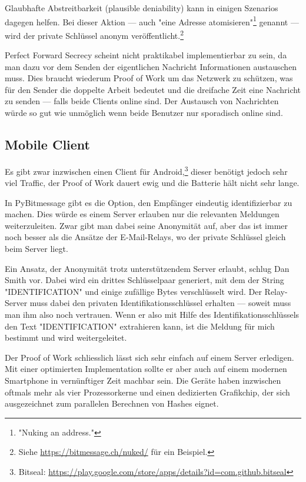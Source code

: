 \documentclass{bfh}
\begin{document}
  Glaubhafte Abstreitbarkeit (plausible deniability) kann in einigen Szenarios dagegen helfen. Bei dieser Aktion --- auch "{}eine Adresse atomisieren"\footnote{"Nuking an address."} genannt --- wird der private Schlüssel anonym veröffentlicht.\footnote{Siehe \url{https://bitmessage.ch/nuked/} für ein Beispiel.}

  Perfect Forward Secrecy scheint nicht praktikabel implementierbar zu sein, da man dazu vor dem Senden der eigentlichen Nachricht Informationen austauschen muss. Dies braucht wiederum Proof of Work um das Netzwerk zu schützen, was für den Sender die doppelte Arbeit bedeutet und die dreifache Zeit eine Nachricht zu senden --- falls beide Clients online sind. Der Austausch von Nachrichten würde so gut wie unmöglich wenn beide Benutzer nur sporadisch online sind.

  \subsection{Mobile Client}

  Es gibt zwar inzwischen einen Client für Android,\footnote{Bitseal: \url{https://play.google.com/store/apps/details?id=com.github.bitseal}} dieser benötigt jedoch sehr viel Traffic, der Proof of Work dauert ewig und die Batterie hält nicht sehr lange.

  In PyBitmessage gibt es die Option, den Empfänger eindeutig identifizierbar zu machen. Dies würde es einem Server erlauben nur die relevanten Meldungen weiterzuleiten. Zwar gibt man dabei seine Anonymität auf, aber das ist immer noch besser als die Ansätze der E-Mail-Relays, wo der private Schlüssel gleich beim Server liegt.

  Ein Ansatz, der Anonymität trotz unterstützendem Server erlaubt, schlug Dan Smith vor.\cite{forum:msg7871} Dabei wird ein drittes Schlüsselpaar generiert, mit dem der String "{}IDENTIFICATION"{} und einige zufällige Bytes verschlüsselt wird. Der Relay-Server muss dabei den privaten Identifikationsschlüssel erhalten --- soweit muss man ihm also noch vertrauen. Wenn er also mit Hilfe des Identifikationsschlüssels den Text "{}IDENTIFICATION"{} extrahieren kann, ist die Meldung für mich bestimmt und wird weitergeleitet.

  Der Proof of Work schliesslich lässt sich sehr einfach auf einem Server erledigen. Mit einer optimierten Implementation sollte er aber auch auf einem modernen Smartphone in vernünftiger Zeit machbar sein. Die Geräte haben inzwischen oftmals mehr als vier Prozessorkerne und einen dedizierten Grafikchip, der sich ausgezeichnet zum parallelen Berechnen von Hashes eignet.
\end{document}
